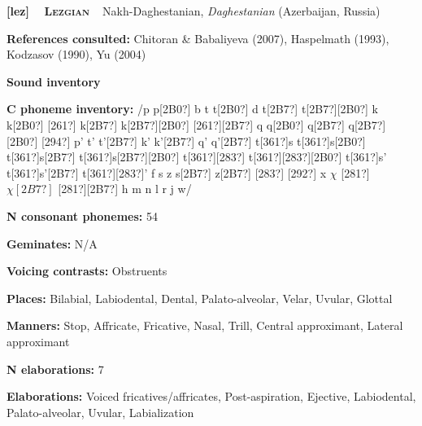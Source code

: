 \clearpage\begin{styleBody}
\textbf{[lez] }\ \ \textbf{\textsc{Lezgian}}\textbf{\ \ }Nakh-Daghestanian, \textit{Daghestanian} (Azerbaijan, Russia)
\end{styleBody}

\begin{styleBody}
\textbf{References consulted: }Chitoran \& Babaliyeva (2007), Haspelmath (1993), Kodzasov (1990), Yu (2004)
\end{styleBody}

\begin{styleBody}
\textbf{Sound inventory}
\end{styleBody}

\begin{styleBody}
\textbf{C phoneme inventory:} /p p[2B0?] b t t[2B0?] d t[2B7?] t[2B7?][2B0?] k k[2B0?] [261?] k[2B7?] k[2B7?][2B0?] [261?][2B7?] q q[2B0?] q[2B7?] q[2B7?][2B0?] [294?] p’ t’ t’[2B7?] k’ k’[2B7?] q’ q’[2B7?] t[361?]s t[361?]s[2B0?] t[361?]s[2B7?] t[361?]s[2B7?][2B0?] t[361?][283?] t[361?][283?][2B0?] t[361?]s’ t[361?]s’[2B7?] t[361?][283?]’ f s z s[2B7?] z[2B7?] [283?] [292?] x $\chi $ [281?] $\chi [2B7?]$ [281?][2B7?] h m n l r j w/
\end{styleBody}

\begin{styleBody}
\textbf{N consonant phonemes:} 54
\end{styleBody}

\begin{styleBody}
\textbf{Geminates:} N/A
\end{styleBody}

\begin{styleBody}
\textbf{Voicing contrasts:} Obstruents
\end{styleBody}

\begin{styleBody}
\textbf{Places:} Bilabial, Labiodental, Dental, Palato-alveolar, Velar, Uvular, Glottal
\end{styleBody}

\begin{styleBody}
\textbf{Manners:} Stop, Affricate, Fricative, Nasal, Trill, Central approximant, Lateral approximant
\end{styleBody}

\begin{styleBody}
\textbf{N elaborations:} 7
\end{styleBody}

\begin{styleBody}
\textbf{Elaborations:} Voiced fricatives/affricates, Post-aspiration, Ejective, Labiodental, Palato-alveolar, Uvular, Labialization
\end{styleBody}

